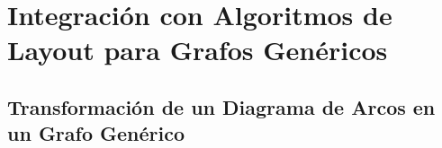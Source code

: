 	
	
	
	
	
	

\section{Integración con Algoritmos de Layout para Grafos Genéricos}

\subsection{Transformación de un Diagrama de Arcos en un Grafo Genérico}